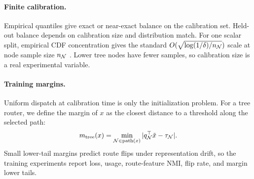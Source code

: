 \paragraph{Finite calibration.}
Empirical quantiles give exact or near-exact balance on the calibration set.
Held-out balance depends on calibration size and distribution match.  For one
scalar split, empirical CDF concentration gives the standard
$O(\sqrt{\log(1/\delta)/n_{\mathcal{N}}})$ scale at node sample size $n_{\mathcal{N}}$
\cite{dvoretzky1956asymptotic}.  Lower tree nodes have fewer samples, so
calibration size is a real experimental variable.

\paragraph{Training margins.}
Uniform dispatch at calibration time is only the initialization problem.  For a
tree router, we define the margin of $x$ as the closest distance to a threshold
along the selected path:
\begin{equation}
  m_{\mathrm{tree}}(x)=
  \min_{\mathcal{N}\in\mathrm{path}(x)}
  |q_{\mathcal{N}}^{\top}\tilde x-\tau_{\mathcal{N}}|.
\end{equation}
Small lower-tail margins predict route flips under representation drift, so the
training experiments report loss, usage, route-feature NMI, flip rate, and
margin lower tails.
